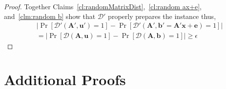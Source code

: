 \documentclass[11pt]{article}
\newcommand{\class}[1]{{\ensuremath{\mathsf{#1}}}}
\newcommand{\vect}[1]{\ensuremath{\textbf{#1}}}
\newcommand{\Fq}{\ensuremath{\mathbb{F}_q}}
\newcommand{\D}{\mathcal{D}}
\newcommand{\LWE}{\class{LWE}}
\newcommand{\ve}{\vect{e}}
\newcommand{\vA}{\vect{A}}
\newcommand{\vx}{\vect{x}}
\newcommand{\va}{\vect{a}}
\newcommand{\vb}{\vect{b}}
\newcommand{\vu}{\vect{u}}
\newcommand{\ignore}[1]{}
\begin{document}
\begin{proof}
%
Together Claims~\ref{cl:randomMatrixDist},~\ref{cl:random ax+e}, and~\ref{clm:random b} show that $\D'$ properly prepares the instance thus, 
\begin{align*}
&\left|\Pr\left[\D'(\vA', \vu') = 1\right]- \Pr\left[\D'(\vA', \vb'=\vA'\vx + \ve)=1\right]  \right|\\
& =\left|\Pr\left[\D(\vA, \vu)=1\right]- \Pr\left[\D(\vA, \vb)=1\right]  \right|\geq \epsilon
\end{align*}
\ignore{
Before randomized:
$$\vA'\vx' + \ve = \vb'$$
For $i = 1\ldots m$,
$$\sum^{n+\alpha}_{j=1}A_{ij}x_j + e_i = b_i$$
For $i = 1\ldots \alpha$,
$$\sum^{n+\alpha}_{j=1}A_{(m+i)j}x_j = \sum^{n}_{j=1}F_{ij}x_j + x_{n+i} = b_{m+i}$$
}
\end{proof}


\section{Additional Proofs}
\end{document}
